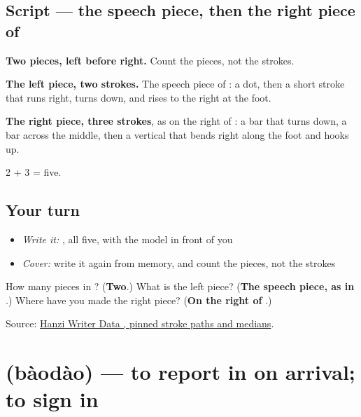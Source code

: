 \subsection*{Script — the speech piece, then the right piece of }

\begin{quote}
\end{quote}

\textbf{Two pieces, left before right.} Count the pieces, not the strokes.

\textbf{The left piece, two strokes.} The speech piece of : a dot, then a short stroke that runs right, turns down, and rises to the right at the foot.

\textbf{The right piece, three strokes}, as on the right of : a bar that turns down, a bar across the middle, then a vertical that bends right along the foot and hooks up.

2 + 3 = five.

\subsection*{Your turn}
\begin{itemize}
\raggedright
  \item \emph{Write it:} , all five, with the model in front of you
  \item \emph{Cover:} write it again from memory, and count the pieces, not the strokes
\end{itemize}

\begin{tcolorbox}[breakable,colback=teal!4,colframe=teal!35!black,title={Before you move on}]
How many pieces in ? (\textbf{Two}.) What is the left piece? (\textbf{The speech piece, as in }.) Where have you made the right piece? (\textbf{On the right of }.)

Source: \href{https://raw.githubusercontent.com/chanind/hanzi-writer-data/68d10a4b21150cae5e1ebbd223eed289cf32d90c/data/\%E8\%AE\%B0.json}{Hanzi Writer Data , pinned stroke paths and medians}.
\end{tcolorbox}
\section[\texorpdfstring{\zh{报到} (bàodào)}{报到 (bàodào)}]{ (bàodào) — to report in on arrival; to sign in}

